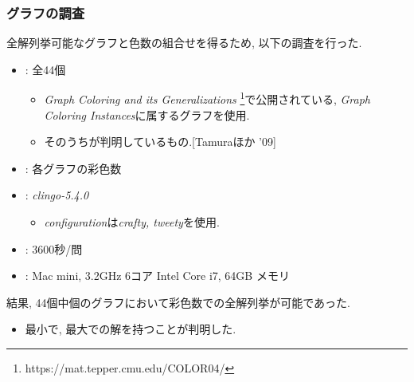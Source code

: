 \documentclass[dvipdfmx,11pt]{beamer}
\begin{document}
\begin{frame}\frametitle{グラフの調査}
  全解列挙可能なグラフと色数の組合せを得るため, 以下の調査を行った.
  \begin{itemize}
    \item {}: 全44個
    \begin{itemize}
      \item \textit{Graph Coloring and its Generalizations}
      \footnote{https://mat.tepper.cmu.edu/COLOR04/}で公開されている, \textit{Graph Coloring Instances}に属するグラフを使用.
      \item そのうちが判明しているもの.[Tamuraほか '09]
    \end{itemize}
    \item {}: 各グラフの彩色数

    \item {}: \textit{clingo-5.4.0}
      \begin{itemize}
        \item \textit{configuration}は\textit{crafty, tweety}を使用.
      \end{itemize}
    \item {}: 3600秒/問
    \item {}: Mac mini, 3.2GHz 6コア Intel Core i7, 64GB メモリ
  \end{itemize}


  \begin{alertblock}{}
    結果, 44個中個のグラフにおいて彩色数での全解列挙が可能であった.
    \begin{itemize}
      \item 最小で, 最大での解を持つことが判明した.
    \end{itemize}
  \end{alertblock}
  
  
\end{frame}

\end{document}
